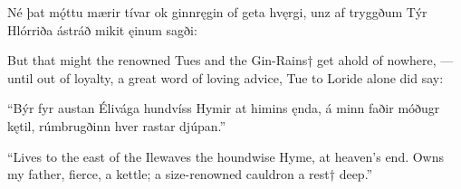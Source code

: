 Né þat mǫ́ttu \hld mærir tívar
ok ginnręgin \hld of geta hvęrgi,
unz af tryggðum \hld Týr Hlórriða
ástráð mikit \hld ęinum sagði:

But that might the renowned Tues and the Gin-Rains† get ahold of nowhere, — until out of loyalty, a great word of loving advice, Tue to Loride alone did say:

“Býr fyr austan \hld Élivága
hundvíss Hymir \hld at himins ęnda,
á minn faðir \hld móðugr kętil,
rúmbrugðinn hver \hld rastar djúpan.”

“Lives to the east of the Ilewaves the houndwise Hyme\footnotemark[1], at heaven’s end. Owns my father, fierce, a kettle; a size-renowned cauldron a rest† deep.”
